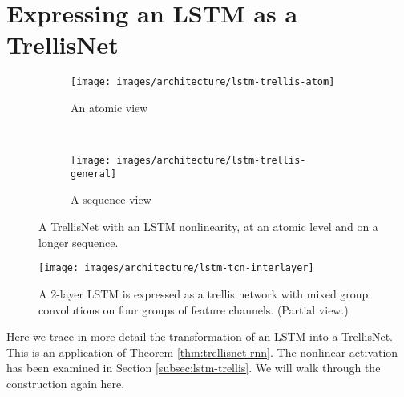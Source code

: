 \documentclass{article} \usepackage{iclr2019_conference,times}
\begin{document}



\newpage

\appendix

\section{Expressing an LSTM as a TrellisNet}
\label{appendix:trellisnet-gated-activation}

\begin{figure}[h]
    \centering
    \begin{subfigure}[b]{.34\textwidth}
        \centering
        \texttt{[image: images/architecture/lstm-trellis-atom]}
        \caption{An atomic view}
        \label{fig:lstm-trellis-atom-appendix}
    \end{subfigure}
    ~
    \begin{subfigure}[b]{.64\textwidth}
        \centering
        \texttt{[image: images/architecture/lstm-trellis-general]}
        \caption{A sequence view}
        \label{fig:lstm-trellis-general}
    \end{subfigure}
    \caption{A TrellisNet with an LSTM nonlinearity, at an atomic level and on a longer sequence.}
    \label{fig:lstm-trellis-network}
\end{figure}

\begin{figure}[b]
    \centering
    \texttt{[image: images/architecture/lstm-tcn-interlayer]}
    \caption{A 2-layer LSTM is expressed as a trellis network with mixed group convolutions on four groups of feature channels. (Partial view.)}
    \label{fig:lstm-tcn-interlayer}
\end{figure}

Here we trace in more detail the transformation of an LSTM into a TrellisNet. This is an application of Theorem \ref{thm:trellisnet-rnn}. The nonlinear activation has been examined in Section \ref{subsec:lstm-trellis}. We will walk through the construction again here.
\end{document}
